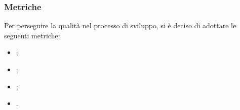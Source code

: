 

\subsubsection{Metriche}
Per perseguire la qualità nel processo di sviluppo, si è deciso di adottare le
seguenti metriche:
\begin{itemize}
    \item {};
    \item {};
    \item {};
    \item {}.
\end{itemize}

